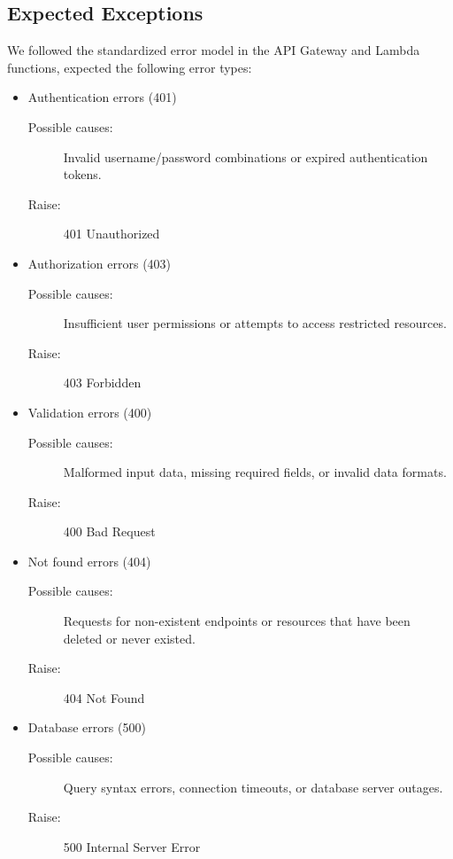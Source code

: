 \documentclass[a4paper, 11pt]{scrreprt}
\begin{document}
\subsection{Expected Exceptions}
We followed the standardized error model in the API Gateway and Lambda functions, expected the following error types:\\
\begin{itemize}
    \item Authentication errors (401) 
        \begin{description}
            \item[Possible causes:] Invalid username/password combinations or expired authentication tokens.
            \item[Raise:] 401 Unauthorized
        \end{description}
    \item Authorization errors (403) 
        \begin{description}
            \item[Possible causes:] Insufficient user permissions or attempts to access restricted resources.
            \item[Raise:] 403 Forbidden
        \end{description}
    \item Validation errors (400) 
        \begin{description}
            \item[Possible causes:] Malformed input data, missing required fields, or invalid data formats.
            \item[Raise:] 400 Bad Request
        \end{description}
    \item Not found errors (404) 
        \begin{description}
            \item[Possible causes:] Requests for non-existent endpoints or resources that have been deleted or never existed.
            \item[Raise:] 404 Not Found
        \end{description}
    \item Database errors (500) 
        \begin{description}
            \item[Possible causes:] Query syntax errors, connection timeouts, or database server outages.
            \item[Raise:] 500 Internal Server Error
        \end{description}

\end{itemize}
\end{document}
